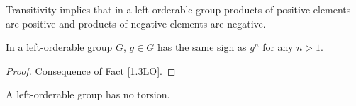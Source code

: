 \begin{fact} Transitivity implies that in a left-orderable group products of positive elements are positive and products of negative elements are negative.
\label{1.3LO}
\end{fact}

\begin{proposition} In a left-orderable group $G$, $g\in{}G$ has the same sign as $g^{n}$ for any $n>1$.
\label{proposition:pospowers}
\end{proposition}
\begin{proof} Consequence of Fact \ref{1.3LO}.
\end{proof}

\begin{fact} A left-orderable group has no torsion.
\label{fact:torsion}
\end{fact}


